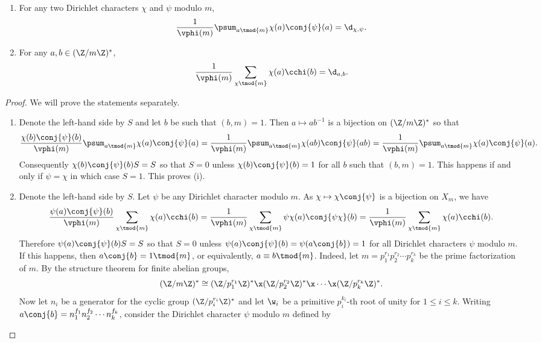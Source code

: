    \begin{proposition}\label{prop:Dirichlet_orthogonality_relations}
    \phantom{ }
      \begin{enumerate}[label=(\roman*)]
        \item For any two Dirichlet characters $\chi$ and $\psi$ modulo $m$,
        \[
          \frac{1}{\vphi(m)}\psum_{a \tmod{m}}\chi(a)\conj{\psi}(a) = \d_{\chi,\psi}.
        \]
        \item For any $a,b \in (\Z/m\Z)^{\ast}$,
        \[
          \frac{1}{\vphi(m)}\sum_{\chi \tmod{m}}\chi(a)\cchi(b) = \d_{a,b}.
        \]
      \end{enumerate}
    \end{proposition}
    \begin{proof}
      We will prove the statements separately.
      \begin{enumerate}[label=(\roman*)]
        \item Denote the left-hand side by $S$ and let $b$ be such that $(b,m) = 1$. Then $a \mapsto ab^{-1}$ is a bijection on $(\Z/m\Z)^{\ast}$ so that
        \[
          \frac{\chi(b)\conj{\psi}(b)}{\vphi(m)}\psum_{a \tmod{m}}\chi(a)\conj{\psi}(a) = \frac{1}{\vphi(m)}\psum_{a \tmod{m}}\chi(ab)\conj{\psi}(ab) = \frac{1}{\vphi(m)}\psum_{a \tmod{m}}\chi(a)\conj{\psi}(a).
        \]
        Consequently $\chi(b)\conj{\psi}(b)S = S$ so that $S = 0$ unless $\chi(b)\conj{\psi}(b) = 1$ for all $b$ such that $(b,m) = 1$. This happens if and only if $\psi = \chi$ in which case $S = 1$. This proves (i).
        \item Denote the left-hand side by $S$. Let $\psi$ be any Dirichlet character modulo $m$. As $\chi \mapsto \chi\conj{\psi}$ is a bijection on $X_{m}$, we have
        \[
          \frac{\psi(a)\conj{\psi}(b)}{\vphi(m)}\sum_{\chi \tmod{m}}\chi(a)\cchi(b) = \frac{1}{\vphi(m)}\sum_{\chi \tmod{m}}\psi\chi(a)\conj{\psi\chi}(b) = \frac{1}{\vphi(m)}\sum_{\chi \tmod{m}}\chi(a)\cchi(b).
        \]
        Therefore $\psi(a)\conj{\psi}(b)S = S$ so that $S = 0$ unless $\psi(a)\conj{\psi}(b) = \psi(a\conj{b}) = 1$ for all Dirichlet characters $\psi$ modulo $m$. If this happens, then $a\conj{b} = 1 \tmod{m}$, or equivalently, $a \equiv b \tmod{m}$. Indeed, let $m = p_{1}^{r_{1}}p_{2}^{r_{2}} \cdots p_{k}^{r_{k}}$ be the prime factorization of $m$. By the structure theorem for finite abelian groups,
        \[
          (\Z/m\Z)^{\ast} \cong (\Z/p_{1}^{r_{1}}\Z)^{\ast} \x (\Z/p_{2}^{r_{2}}\Z)^{\ast} \x \cdots \x (\Z/p_{k}^{r_{k}}\Z)^{\ast}.
        \]
        Now let $n_{i}$ be a generator for the cyclic group $(\Z/p_{i}^{r_{i}}\Z)^{\ast}$ and let $\w_{i}$ be a primitive $p_{i}^{k_{i}}$-th root of unity for $1 \le i \le k$. Writing $a\conj{b} = n_{1}^{f_{1}}n_{2}^{f_{2}} \cdots n_{k}^{f_{k}}$, consider the Dirichlet character $\psi$ modulo $m$ defined by

\end{enumerate}
\end{proof}
